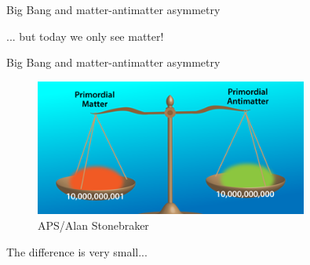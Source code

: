 \documentclass[dvipsnames]{beamer}
\begin{document}
\begin{frame}{Big Bang and matter-antimatter asymmetry}
  \begin{figure}
  \end{figure}
  \begin{center}
    \Large ... but today we only see matter!
  \end{center}
\end{frame}

\begin{frame}{Big Bang and matter-antimatter asymmetry}
  \begin{figure}
    \includegraphics[width=0.8\textwidth,trim={0.9cm 0 0.9cm 0},clip=true]{Plots/PrimordialAntimatter.png}
    \caption*{\tiny APS/Alan Stonebraker}
  \end{figure}
  \vspace{-0.5cm}
  \begin{center}
    \Large The difference is very small...
  \end{center}
\end{frame}
\end{document}
